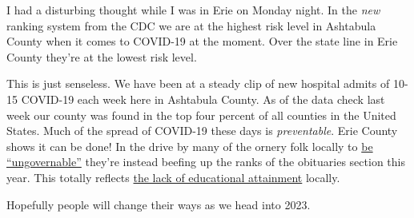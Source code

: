 I had a disturbing thought while I was in Erie on Monday night. In the
\emph{new} ranking system from the CDC we are at the highest risk level
in Ashtabula County when it comes to COVID-19 at the moment. Over the
state line in Erie County they're at the lowest risk level.

This is just senseless. We have been at a steady clip of new hospital
admits of 10-15 COVID-19 each week here in Ashtabula County. As of the
data check last week our county was found in the top four percent of all
counties in the United States. Much of the spread of COVID-19 these days
is \emph{preventable}. Erie County shows it can be done! In the drive by
many of the ornery folk locally to
\href{https://knowyourmeme.com/memes/become-ungovernable}{be
``ungovernable''} they're instead beefing up the ranks of the obituaries
section this year. This totally reflects
\href{https://web.archive.org/web/20221129053355/https://devresearch.ohio.gov/files/research/P7007.pdf}{the
lack of educational attainment} locally.

Hopefully people will change their ways as we head into 2023.
